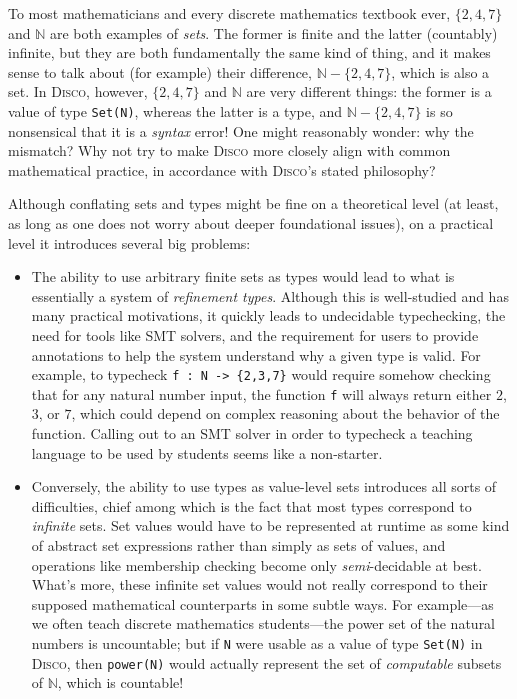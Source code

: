 \documentclass[copyright,creativecommons,12pt]{eptcs}
\newcommand{\disco}{\textsc{Disco}\xspace}
\newcommand{\N}{\mathbb{N}}
\begin{document}
To most mathematicians and every discrete mathematics textbook ever,
$\{2,4,7\}$ and $\N$ are both examples of \emph{sets}.  The former is
finite and the latter (countably) infinite, but they are both
fundamentally the same kind of thing, and it makes sense to talk about
(for example) their difference, $\N - \{2,4,7\}$, which is also a set.
In \disco, however, $\{2,4,7\}$ and $\N$ are very different things:
the former is a value of type \texttt{Set(N)}, whereas the
latter is a type, and $\N - \{2,4,7\}$ is so nonsensical that it is a
\emph{syntax} error!  One might reasonably wonder: why the mismatch?
Why not try to make \disco more closely align with common mathematical
practice, in accordance with \disco's stated philosophy?

Although conflating sets and types might be fine on a theoretical
level (at least, as long as one does not worry about deeper
foundational issues), on a practical level it introduces several
big problems:

\begin{itemize}
\item The ability to use arbitrary finite sets as types would lead to
  what is essentially a system of \emph{refinement types}.  Although
  this is well-studied and has many practical motivations, it quickly
  leads to undecidable typechecking, the need for tools like SMT
  solvers, and the requirement for users to provide annotations to
  help the system understand why a given type is valid.  For example,
  to typecheck %
  \verb|f : N -> {2,3,7}| would require somehow checking that for any
  natural number input, the function \verb|f| will always return
  either $2$, $3$, or $7$, which could depend on complex reasoning
  about the behavior of the function.  Calling out to an SMT solver in
  order to typecheck a teaching language to be used by students seems
  like a non-starter.
\item Conversely, the ability to use types as value-level sets
  introduces all sorts of difficulties, chief among which is the fact
  that most types correspond to \emph{infinite} sets.  Set values
  would have to be represented at runtime as some kind of abstract set
  expressions rather than simply as sets of values, and operations
  like membership checking become only \emph{semi}-decidable at best.
  What's more, these infinite set values would not really correspond
  to their supposed mathematical counterparts in some subtle ways.
  For example---as we often teach discrete mathematics students---the
  power set of the natural numbers is uncountable; but if \texttt{N}
  were usable as a value of type \texttt{Set(N)} in \disco, then
  \texttt{power(N)} would actually represent the set of
  \emph{computable} subsets of $\N$, which is countable!
\end{itemize}
\end{document}
